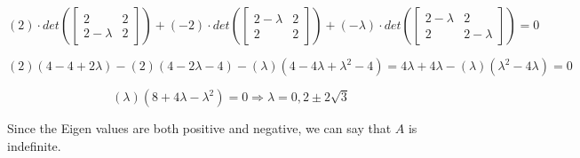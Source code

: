 \documentclass[12pt]{extarticle}
\theoremstyle{definition}
\begin{document}
\begin{problem}
	$$(2)\cdot det(\begin{bmatrix}2&2\\2-\lambda&2\end{bmatrix}) + (-2)\cdot det(\begin{bmatrix}2-\lambda&2\\2&2\end{bmatrix}) + 
	(-\lambda)\cdot det(\begin{bmatrix}2-\lambda&2\\2&2-\lambda\end{bmatrix}) = 0$$

	$$(2)(4-4+2\lambda)-(2)(4-2\lambda-4)-(\lambda)(4-4\lambda+{\lambda}^2-4)=4\lambda+4\lambda-(\lambda)({\lambda}^2-4\lambda)=0$$

	$$(\lambda)(8+4\lambda-{\lambda}^2) = 0 \Longrightarrow \lambda = 0, 2 \pm 2 \sqrt{3}$$

	Since the Eigen values are both positive and negative, we can say that $A$ is indefinite.
\end{problem}
\end{document}
